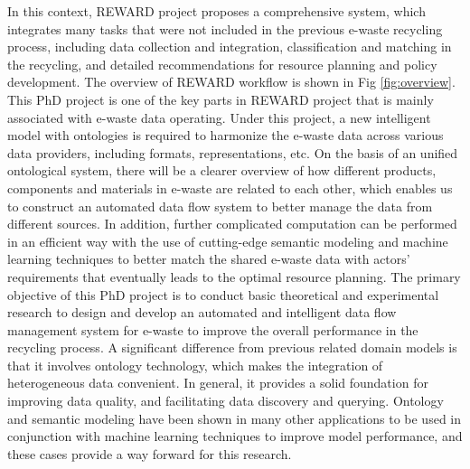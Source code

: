 \documentclass{article}
\numberwithin{equation}{section}
\begin{document}
In this context, REWARD project proposes a comprehensive system, which integrates many tasks that were not included in the previous e-waste recycling process, including data collection and integration, classification and matching in the recycling, and detailed recommendations for resource planning and policy development. The overview of REWARD workflow is shown in Fig \ref{fig:overview}. This PhD project is one of the key parts in REWARD project that is mainly associated with e-waste data operating. Under this project, a new intelligent model with ontologies is required to harmonize the e-waste data across various data providers, including formats, representations, etc. On the basis of an unified ontological system, there will be a clearer overview of how different products, components and materials in e-waste are related to each other, which enables us to construct an automated data flow system to better manage the data from different sources. In addition, further complicated computation can be performed in an efficient way with the use of cutting-edge semantic modeling and machine learning techniques to better match the shared e-waste data with actors’ requirements that eventually leads to the optimal resource planning. 
The primary objective of this PhD project is to conduct basic theoretical and experimental research to design and develop an automated and intelligent data flow management system for e-waste to improve the overall performance in the recycling process. A significant difference from previous related domain models is that it involves ontology technology, which makes the integration of heterogeneous data convenient. In general, it provides a solid foundation for improving data quality, and facilitating data discovery and querying. Ontology and semantic modeling have been shown in many other applications to be used in conjunction with machine learning techniques to improve model performance, and these cases provide a way forward for this research.
\end{document}
